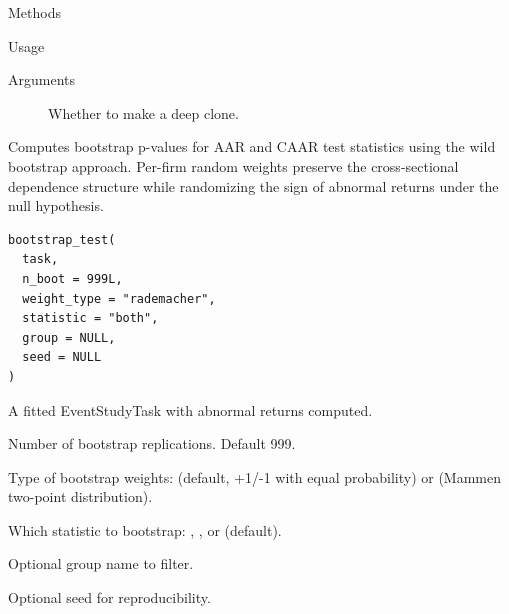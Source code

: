 \documentclass[a4paper]{book}
\begin{document}
\begin{Section}{Methods}
\begin{SubSection}{}
\begin{SubSubSection}{Usage}
\end{SubSubSection}

%
\begin{SubSubSection}{Arguments}

\begin{description}

\item[] Whether to make a deep clone.

\end{description}



\end{SubSubSection}

\end{SubSection}


\end{Section}
%
\begin{Description}
Computes bootstrap p-values for AAR and CAAR test statistics using
the wild bootstrap approach. Per-firm random weights preserve the
cross-sectional dependence structure while randomizing the sign of
abnormal returns under the null hypothesis.
\end{Description}
%
\begin{Usage}
\begin{verbatim}
bootstrap_test(
  task,
  n_boot = 999L,
  weight_type = "rademacher",
  statistic = "both",
  group = NULL,
  seed = NULL
)
\end{verbatim}
\end{Usage}
%
\begin{Arguments}
\begin{ldescription}
\item[\code{task}] A fitted EventStudyTask with abnormal returns computed.

\item[\code{n\_boot}] Number of bootstrap replications. Default 999.

\item[\code{weight\_type}] Type of bootstrap weights:  (default,
+1/-1 with equal probability) or  (Mammen two-point
distribution).

\item[\code{statistic}] Which statistic to bootstrap: , ,
or  (default).

\item[\code{group}] Optional group name to filter.

\item[\code{seed}] Optional seed for reproducibility.
\end{ldescription}
\end{Arguments}
\end{document}
